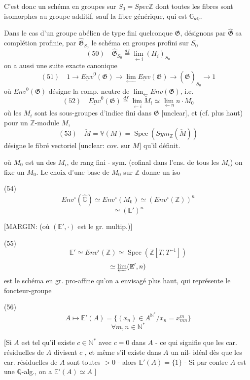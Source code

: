 \newpage


C'est donc un schéma en groupes sur $S_0 = Spec \mathbb{Z}$
dont toutes les fibres sont isomorphes au groupe
additif, sauf la fibre générique, qui est
$\mathbb{G}_{a \mathbb{Q}}$.

Dans le cas d'un groupe abélien
de type fini quelconque $\mathfrak{G}$, désignons par $\hat{\mathfrak{G}}$ sa
complétion profinie, par $\hat{\mathfrak{G}}_{S_0}$ le schéma
en groupes profini sur $S_0$
$$ (50) \quad \hat{\mathfrak{G}}_{S_0} \overset{df}{=} \lim_{\leftarrow i} (H_i)_{S_0} $$
on a aussi une suite exacte canonique
$$ (51) \quad 1 \to \underline{Env}^0(\mathfrak{G}) \to \lim_{\leftarrow} \underline{Env}(\mathfrak{G}) \to (\hat{\mathfrak{G}})_{S_0} \to 1 $$
où $\underline{Env}^0(\mathfrak{G})$ désigne la comp. neutre
de $\lim_{\leftarrow} \underline{Env}(\mathfrak{G})$, i.e.
$$ (52) \quad \underline{Env}^0(\mathfrak{G}) \overset{df}{=} \lim_{\leftarrow i} \check{M}_i \simeq \lim_{\leftarrow n} n \cdot M_0 $$
où les $M_i$ sont les sous-groupes d'indice
fini dans $\mathfrak{G}$ [unclear], et (cf.
plus haut) pour un $\mathbb{Z}$-module $M$,
$$ (53) \quad \check{M} = \mathbb{V}(M) = \operatorname{Spec}(Sym_{\mathbb{Z}}(\check{M})) $$
désigne le fibré vectoriel [unclear: cov. sur $M$] qu'il définit.

\newpage


où $M_0$ est un des $M_i$, de rang fini
- sym. (cofinal dans l'ens. de tous les
$M_i$) on fixe un $M_0$. Le choix d'une
base de $M_0$ sur $\mathbb{Z}$ donne un
iso

(54) $$Env^\circ(\hat{\mathbb{C}}) \simeq Env^\circ(M_0) \simeq (Env^\circ(\mathbb{Z}))^n$$
$$\simeq (\mathbb{E}')^n$$

[MARGIN: (où $(\mathbb{E}', \cdot)$ est le gr. multip.)]

(55) $$\mathbb{E}' \simeq Env^\circ(\mathbb{Z}) \simeq \operatorname{Spec}(\mathbb{Z}[T, T^{-1}])$$
$$\simeq \varprojlim (\mathbb{E}', n)$$
est le schéma en gr. pro-affine qu'on a
envisagé plus haut, qui représente le foncteur-groupe

(56) $$A \longmapsto \mathbb{E}'(A) = \{ (x_n) \in A^{\mathbb{N}^*} / x_n = x_{mn}^m \}$$
$$\forall m,n \in \mathbb{N}^*$$

[Si $A$ est tel qu'il existe $c \in \mathbb{N}^*$ avec
$c = 0$ dans $A$ - ce qui signifie
que les car. résiduelles de $A$ divisent $c$ ,
et même s'il existe dans $A$ un nil-
idéal dès que les car. résiduelles de $A$ sont
toutes $>0$ - alors $\mathbb{E}'(A) = \{1\}$ -
Si par contre $A$ est une $\mathbb{Q}$-alg., on a $\mathbb{E}'(A) \simeq A$ ]

